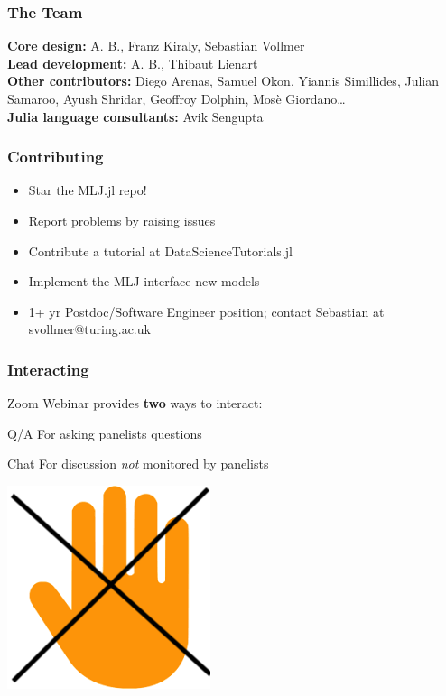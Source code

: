 \documentclass[t]{beamer}
\newcommand\dff{\bf\color{dkgreen}}
\begin{document}
\begin{frame}
  \frametitle{The Team}

  {\small
    {\dff Core design:} A. B., Franz Kiraly, Sebastian Vollmer\\[1\baselineskip]

    {\dff Lead development:} A. B., Thibaut Lienart \\[1\baselineskip]

    {\dff Other contributors:} Diego Arenas, Samuel Okon, Yiannis Simillides, Julian Samaroo, Ayush Shridar, Geoffroy Dolphin, Mosè Giordano\ldots \\[1\baselineskip]
    
    {\dff Julia language consultants:} Avik Sengupta\\[1\baselineskip]}
  
\end{frame}

\begin{frame}
  \frametitle{Contributing}
  \begin{itemize}
     \item Star the MLJ.jl repo!
     \item Report problems by raising issues
     \item Contribute a tutorial at DataScienceTutorials.jl
     \item Implement the MLJ interface new models
     \item 1+ yr Postdoc/Software Engineer position; contact Sebastian
       at svollmer@turing.ac.uk
     \end{itemize}
\end{frame}

\begin{frame}
  \frametitle{Interacting}
   Zoom Webinar provides {\bf two} ways to interact:
  
  \begin{block}{Q/A}
    For asking panelists questions
  \end{block}

  \begin{block}{Chat}
    For discussion {\em not} monitored by panelists
  \end{block}\pause

  \begin{block}{\includegraphics[scale=0.1]{raise_hand_forbidden.png}}
  \end{block}

\end{frame}
\end{document}
